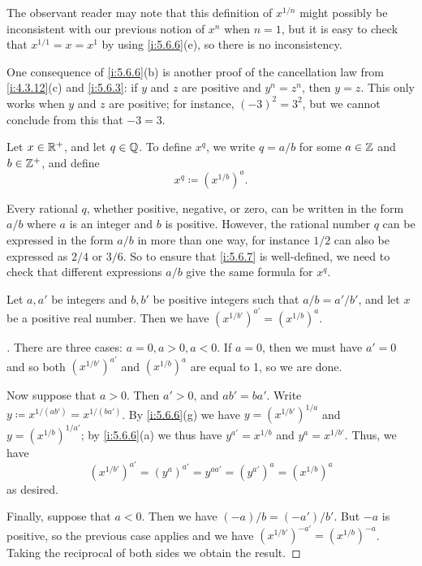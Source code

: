 \begin{note}
  The observant reader may note that this definition of \(x^{1 / n}\) might possibly be inconsistent with our previous notion of \(x^n\) when \(n = 1\), but it is easy to check that \(x^{1 / 1} = x = x^1\) by using \cref{i:5.6.6}(e), so there is no inconsistency.
\end{note}

\begin{note}
  One consequence of \cref{i:5.6.6}(b) is another proof of the cancellation law from \cref{i:4.3.12}(c) and \cref{i:5.6.3}:
  if \(y\) and \(z\) are positive and \(y^n = z^n\), then \(y = z\).
  This only works when \(y\) and \(z\) are positive;
  for instance, \((-3)^2 = 3^2\), but we cannot conclude from this that \(-3 = 3\).
\end{note}

\begin{defn}\label{i:5.6.7}
  Let \(x \in \mathbb{R}^+\), and let \(q \in \mathbb{Q}\).
  To define \(x^q\), we write \(q = a / b\) for some \(a \in \mathbb{Z}\) and \(b \in \mathbb{Z}^+\), and define
  \[
    x^q \coloneqq (x^{1 / b})^a.
  \]
\end{defn}

\begin{note}
  Every rational \(q\), whether positive, negative, or zero, can be written in the form \(a / b\) where \(a\) is an integer and \(b\) is positive.
  However, the rational number \(q\) can be expressed in the form \(a / b\) in more than one way, for instance \(1 / 2\) can also be expressed as \(2 / 4\) or \(3 / 6\).
  So to ensure that \cref{i:5.6.7} is well-defined, we need to check that different expressions \(a / b\) give the same formula for \(x^q\).
\end{note}

\begin{lem}\label{i:5.6.8}
  Let \(a, a'\) be integers and \(b, b'\) be positive integers such that \(a / b = a' / b'\), and let \(x\) be a positive real number.
  Then we have \((x^{1 / b'})^{a'} = (x^{1 / b})^a\).
\end{lem}

\begin{proof}[]
  There are three cases: \(a = 0, a > 0, a < 0\).
  If \(a = 0\), then we must have \(a' = 0\) and so both \((x^{1 / b'})^{a'}\) and \((x^{1 / b})^a\) are equal to 1, so we are done.

  Now suppose that \(a > 0\).
  Then \(a' > 0\), and \(ab' = ba'\).
  Write \(y \coloneqq x^{1 / (ab')} = x^{1 / (ba')}\).
  By \cref{i:5.6.6}(g) we have \(y = (x^{1 / b'})^{1 / a}\) and \(y = (x^{1 / b})^{1 / a'}\);
  by \cref{i:5.6.6}(a) we thus have \(y^{a'} = x^{1 / b}\) and \(y^a = x^{1 / b'}\).
  Thus, we have
  \[
    (x^{1 / b'})^{a'} = (y^a)^{a'} = y^{aa'} = (y^{a'})^a = (x^{1 / b})^a
  \]
  as desired.

  Finally, suppose that \(a < 0\).
  Then we have \((-a) / b = (-a') / b'\).
  But \(-a\) is positive, so the previous case applies and we have \((x^{1 / b'})^{-a'} = (x^{1 / b})^{-a}\).
  Taking the reciprocal of both sides we obtain the result.
\end{proof}

